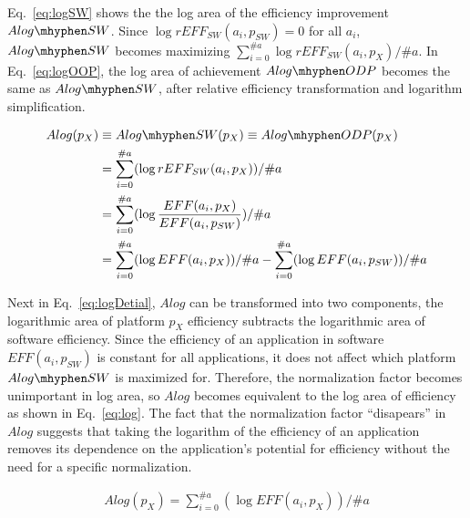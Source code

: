 Eq.~\eqref{eq:logSW} shows the the log area of the efficiency improvement $Alog\mhyphen SW$. 
Since $\log rEFF_{SW}(a_i, p_{SW}) = 0$ for all $a_i$, $Alog\mhyphen SW$ becomes maximizing $\sum_{i=0}^{\#a} \log rEFF_{SW}(a_{i}, p_{X}) / \#a$. In Eq.~\eqref{eq:logOOP}, the log area of achievement $Alog\mhyphen ODP$ becomes the same as $Alog\mhyphen SW$, after relative efficiency transformation and logarithm simplification.


\begingroup\makeatletter{}\check@mathfonts
\vspace{-8pt}
\begin{equation}
\begin{split}
	Alog(p_{X}) &\equiv Alog\mhyphen SW(p_{X}) \equiv Alog\mhyphen ODP(p_{X}) \\
	&= \sum_{i=0}^{\#a} ( \log rEFF_{SW}(a_{i}, p_{X}) ) / \#a  \\
	&= \sum_{i=0}^{\#a} ( \log \frac{EFF(a_{i}, p_{X})}{EFF(a_{i}, p_{SW})}) / \#a \\
	&= \sum_{i=0}^{\#a} ( \log EFF(a_{i}, p_{X}) ) / \#a - \sum_{i=0}^{\#a} ( \log EFF(a_i, p_{SW}) ) / \#a
\label{eq:logDetial}
\end{split}
\end{equation}
\endgroup


Next in Eq.~\eqref{eq:logDetial}, $Alog$ can be transformed into two components, the logarithmic area of platform $p_{X}$ efficiency subtracts the logarithmic area of software efficiency. 
Since the efficiency of an application in software $EFF(a_i, p_{SW})$ is constant for all applications, it does not affect which platform $Alog\mhyphen SW$ is maximized for. Therefore, the normalization factor becomes unimportant in log area, so $Alog$ becomes equivalent to the log area of efficiency as shown in Eq.~\eqref{eq:log}. The fact that the normalization factor ``disapears'' in $Alog$ suggests that taking the logarithm of the efficiency of an application removes its dependence on the application's potential for efficiency without the need for a specific normalization.


\begingroup\makeatletter{}\check@mathfonts
\vspace{-8pt}
\begin{equation}
\begin{split}
	Alog(p_{X}) = \sum_{i=0}^{\#a} ( \log EFF(a_{i}, p_{X}) ) / \#a	
\end{split}
\label{eq:log}
\end{equation}
\endgroup